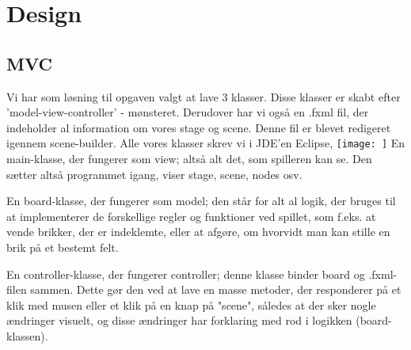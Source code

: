 \usepackage{graphicx}
\graphicspath{{./Downloads/}}
\section{Design}
\subsection{MVC}\label{MVC}
Vi har som løsning til opgaven valgt at lave 3 klasser. Disse klasser er skabt efter 'model-view-controller' - mønsteret. Derudover har vi også en .fxml fil, der indeholder al information om vores stage og scene. Denne fil er blevet redigeret igennem scene-builder. Alle vores klasser skrev vi i JDE'en Eclipse, 
\texttt{[image: ]}
En main-klasse, der fungerer som view; altså alt det, som spilleren kan se. Den sætter altså programmet igang, viser stage, scene, nodes osv. 

En board-klasse, der fungerer som model; den står for alt al logik, der bruges til at implementerer de forskellige regler og funktioner ved spillet, som f.eks. at vende brikker, der er indeklemte, eller at afgøre, om hvorvidt man kan stille en brik på et bestemt felt. 

En controller-klasse, der fungerer controller; denne klasse binder board og .fxml-filen sammen. Dette gør den ved at lave en masse metoder, der responderer på et klik med musen eller et klik på en knap på "scene", således at der sker nogle ændringer visuelt, og disse ændringer har forklaring med rod i logikken (board-klassen).